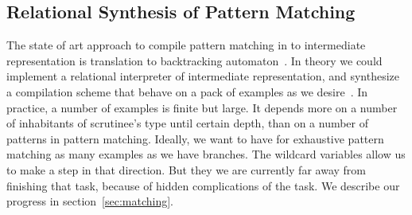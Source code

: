 \subsection{Relational Synthesis of Pattern Matching}

The state of art approach to compile pattern matching in \OCaml{} to intermediate representation is translation to backtracking automaton~\cite{maranget2001}. In theory we could implement a relational interpreter of intermediate representation, and synthesize a compilation scheme that behave on a pack of examples as we desire~\cite{Kosarev2020}. In practice, a number of examples is finite but large. It depends more on a number of inhabitants of scrutinee's type until certain depth, than on a number of patterns in pattern matching. Ideally, we want to have for exhaustive pattern matching as many examples as we have branches. The wildcard variables allow us to make a step in that direction. But they we are currently far away from finishing that task, because of hidden complications of the task. We describe our progress in section~\ref{sec:matching}.


